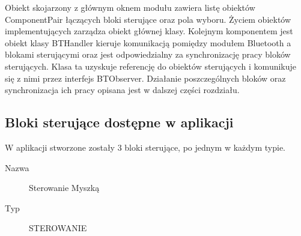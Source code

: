 \documentclass[eng,printmode]{mgr}
\begin{document}
Obiekt skojarzony z głównym oknem modułu zawiera listę obiektów ComponentPair łączących bloki sterujące oraz pola wyboru. Życiem obiektów implementujących zarządza obiekt głównej klasy. Kolejnym komponentem jest obiekt klasy BTHandler kieruje komunikacją pomiędzy modułem Bluetooth  a blokami sterującymi oraz jest odpowiedzialny za synchronizację pracy bloków sterujących. Klasa ta uzyskuje referencję do obiektów sterujących i komunikuje się z nimi przez interfejs BTObserver. Działanie poszczególnych bloków oraz synchronizacja ich pracy opisana jest w dalszej części rozdziału.

\newpage
\subsection{Bloki sterujące dostępne w aplikacji}

W aplikacji stworzone zostały 3 bloki sterujące, po jednym w każdym typie. 

\begin{description}
  \item[Nazwa] Sterowanie Myszką
  \item[Typ] STEROWANIE
\end{description}
\end{document}
